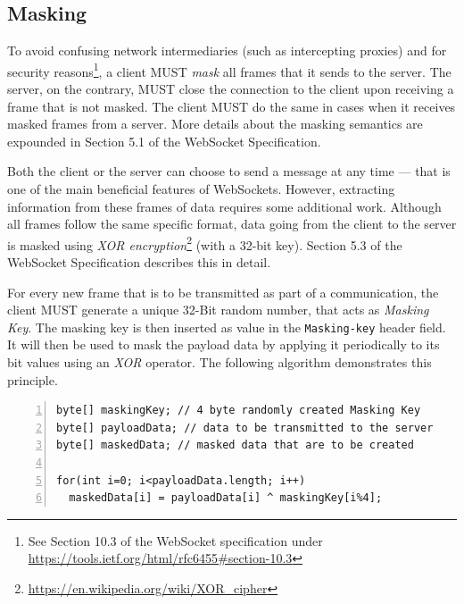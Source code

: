 \documentclass[a4paper, justified, notoc]{tufte-handout} %
\begin{document}
\subsection{Masking} %
\label{sub:masking}

To avoid confusing network intermediaries (such as intercepting proxies) and for security reasons\footnote{See Section 10.3 of the WebSocket specification under \url{https://tools.ietf.org/html/rfc6455\#section-10.3}}, a client MUST \emph{mask} all frames that it sends to the server. The server, on the contrary, MUST close the connection to the client upon receiving a frame that is not masked. The client MUST do the same in cases when it receives masked frames from a server. More details about the masking semantics are expounded in Section 5.1 of the WebSocket Specification.

Both the client or the server can choose to send a message at any time — that is one of the main beneficial features of WebSockets. However, extracting information from these frames of data requires some additional work. Although all frames follow the same specific format, data going from the client to the server is masked using \emph{XOR encryption}\footnote{\url{https://en.wikipedia.org/wiki/XOR_cipher}} (with a 32-bit key). Section 5.3 of the WebSocket Specification describes this in detail.

For every new frame that is to be transmitted as part of a communication, the client MUST generate a unique 32-Bit random number, that acts as \emph{Masking Key}. The masking key is then inserted as value in the \texttt{Masking-key} header field. It will then be used to mask the payload data by applying it periodically to its bit values using an \emph{XOR} operator. The following algorithm demonstrates this principle.

\begin{Verbatim}[gobble=0,frame=lines,numbers=left]
byte[] maskingKey; // 4 byte randomly created Masking Key
byte[] payloadData; // data to be transmitted to the server
byte[] maskedData; // masked data that are to be created
	
for(int i=0; i<payloadData.length; i++)
  maskedData[i] = payloadData[i] ^ maskingKey[i%4];
\end{Verbatim}
\end{document}
